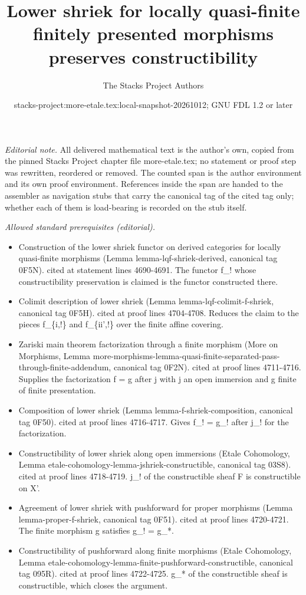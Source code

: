 \documentclass{stacks-project}
\title{Lower shriek for locally quasi-finite finitely presented morphisms preserves constructibility}
\author{The Stacks Project Authors}
\date{stacks-project:more-etale.tex:local-snapshot-20261012; GNU FDL 1.2 or later}
\theoremstyle{plain}
\theoremstyle{definition}
\theoremstyle{remark}
\numberwithin{equation}{subsection}
\begin{document}
\maketitle
\setcounter{subsection}{1}
\noindent\textit{Editorial note.} All delivered mathematical text is the author's own, copied from the pinned Stacks Project chapter file more-etale.tex; no statement or proof step was rewritten, reordered or removed. The counted span is the author environment and its own proof environment. References inside the span are handed to the assembler as navigation stubs that carry the canonical tag of the cited tag only; whether each of them is load-bearing is recorded on the stub itself.\par\medskip
\noindent\textit{Allowed standard prerequisites (editorial).}\begin{itemize}
\item Construction of the lower shriek functor on derived categories for locally quasi-finite morphisms (Lemma lemma-lqf-shriek-derived, canonical tag 0F5N). cited at statement lines 4690-4691. The functor f\_! whose constructibility preservation is claimed is the functor constructed there.
\item Colimit description of lower shriek (Lemma lemma-lqf-colimit-f-shriek, canonical tag 0F5H). cited at proof lines 4704-4708. Reduces the claim to the pieces f\_\{i,!\} and f\_\{ii',!\} over the finite affine covering.
\item Zariski main theorem factorization through a finite morphism (More on Morphisms, Lemma more-morphisms-lemma-quasi-finite-separated-pass-through-finite-addendum, canonical tag 0F2N). cited at proof lines 4711-4716. Supplies the factorization f = g after j with j an open immersion and g finite of finite presentation.
\item Composition of lower shriek (Lemma lemma-f-shriek-composition, canonical tag 0F50). cited at proof lines 4716-4717. Gives f\_! = g\_! after j\_! for the factorization.
\item Constructibility of lower shriek along open immersions (Etale Cohomology, Lemma etale-cohomology-lemma-jshriek-constructible, canonical tag 03S8). cited at proof lines 4718-4719. j\_! of the constructible sheaf F is constructible on X'.
\item Agreement of lower shriek with pushforward for proper morphisms (Lemma lemma-proper-f-shriek, canonical tag 0F51). cited at proof lines 4720-4721. The finite morphism g satisfies g\_! = g\_*.
\item Constructibility of pushforward along finite morphisms (Etale Cohomology, Lemma etale-cohomology-lemma-finite-pushforward-constructible, canonical tag 095R). cited at proof lines 4722-4725. g\_* of the constructible sheaf is constructible, which closes the argument.
\end{itemize}\medskip
\end{document}
